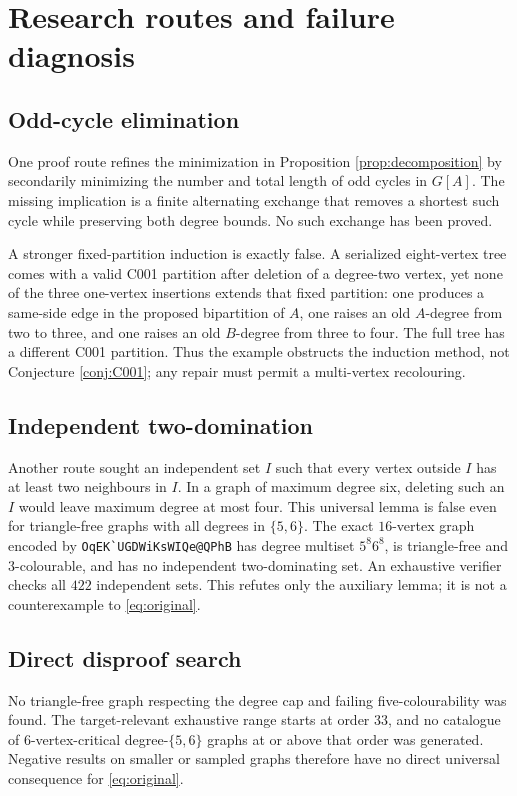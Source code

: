 \documentclass[11pt]{amsart}
\theoremstyle{definition}
\begin{document}
\section{Research routes and failure diagnosis}

\subsection{Odd-cycle elimination}
One proof route refines the minimization in Proposition
\ref{prop:decomposition} by secondarily minimizing the number and total length
of odd cycles in $G[A]$.  The missing implication is a finite alternating
exchange that removes a shortest such cycle while preserving both degree
bounds.  No such exchange has been proved.

A stronger fixed-partition induction is exactly false.  A serialized
eight-vertex tree comes with a valid C001 partition after deletion of a
degree-two vertex, yet none of the three one-vertex insertions extends that
fixed partition: one produces a same-side edge in the proposed bipartition of
$A$, one raises an old $A$-degree from two to three, and one raises an old
$B$-degree from three to four.  The full tree has a different C001 partition.
Thus the example obstructs the induction method, not Conjecture
\ref{conj:C001}; any repair must permit a multi-vertex recolouring.

\subsection{Independent two-domination}
Another route sought an independent set $I$ such that every vertex outside
$I$ has at least two neighbours in $I$.  In a graph of maximum degree six,
deleting such an $I$ would leave maximum degree at most four.  This universal
lemma is false even for triangle-free graphs with all degrees in
$\{5,6\}$.  The exact $16$-vertex graph encoded by
\verb|OqEK`UGDWiKsWIQe@QPhB| has degree multiset $5^8 6^8$, is
triangle-free and $3$-colourable, and has no independent two-dominating set.
An exhaustive verifier checks all $422$ independent sets.  This refutes only
the auxiliary lemma; it is not a counterexample to \eqref{eq:original}.

\subsection{Direct disproof search}
No triangle-free graph respecting the degree cap and failing five-colourability
was found.  The target-relevant exhaustive range starts at order $33$, and no
catalogue of $6$-vertex-critical degree-$\{5,6\}$ graphs at or above that
order was generated.  Negative results on smaller or sampled graphs therefore
have no direct universal consequence for \eqref{eq:original}.
\end{document}
